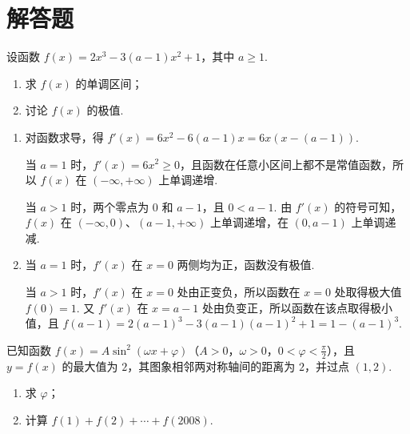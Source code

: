 \section{解答题}
\begin{problem}
设函数 \( f(x) = 2x^{3} - 3(a - 1)x^{2} + 1 \)，其中 \( a \geqslant 1 \).

\begin{enumerate}
\item 求 \( f(x) \) 的单调区间；
\item 讨论 \( f(x) \) 的极值.
\end{enumerate}
\end{problem}

\begin{solution}
\begin{enumerate}
\item 对函数求导，得 \(f'(x)=6x^2-6(a-1)x=6x\left(x-(a-1)\right)\).

当 \(a=1\) 时，\(f'(x)=6x^2\geqslant0\)，且函数在任意小区间上都不是常值函数，所以 \(f(x)\) 在 \((-\infty,+\infty)\) 上单调递增.

当 \(a>1\) 时，两个零点为 \(0\) 和 \(a-1\)，且 \(0<a-1\). 由 \(f'(x)\) 的符号可知，\(f(x)\) 在 \((-\infty,0)\)、\((a-1,+\infty)\) 上单调递增，在 \((0,a-1)\) 上单调递减.
\item 当 \(a=1\) 时，\(f'(x)\) 在 \(x=0\) 两侧均为正，函数没有极值.

当 \(a>1\) 时，\(f'(x)\) 在 \(x=0\) 处由正变负，所以函数在 \(x=0\) 处取得极大值 \(f(0)=1\). 又 \(f'(x)\) 在 \(x=a-1\) 处由负变正，所以函数在该点取得极小值，且 \(f(a-1)=2(a-1)^3-3(a-1)(a-1)^2+1=1-(a-1)^3\).
\end{enumerate}
\end{solution}

\begin{problem}
已知函数 \( f(x) = A \sin^2 (\omega x + \varphi) \)（\(A > 0\)，\(\omega > 0\)，\(0 < \varphi < \frac{\pi}{2}\)），且 \( y = f(x) \) 的最大值为 \(2\)，其图象相邻两对称轴间的距离为 \(2\)，并过点 \((1,2)\).

\begin{enumerate}
\item 求 \( \varphi \)；
\item 计算 \( f(1) + f(2) + \cdots + f(2008) \).
\end{enumerate}
\end{problem}

